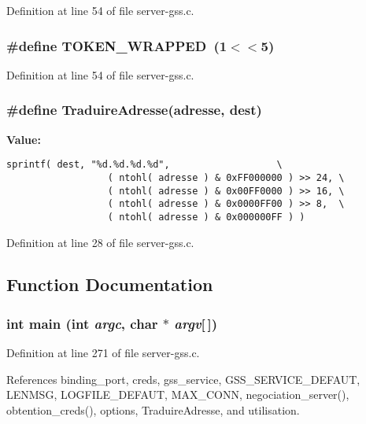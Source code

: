 Definition at line 54 of file server-gss.c.
\subsubsection{\setlength{\rightskip}{0pt plus 5cm}\#define TOKEN\_\-WRAPPED\ (1$<$$<$5)}\label{server-gss_8c_a11}




Definition at line 54 of file server-gss.c.
\subsubsection{\setlength{\rightskip}{0pt plus 5cm}\#define Traduire\-Adresse(adresse, dest)}\label{server-gss_8c_a0}


{\bf Value:}

\footnotesize\begin{verbatim}sprintf( dest, "%d.%d.%d.%d",                   \
                  ( ntohl( adresse ) & 0xFF000000 ) >> 24, \
                  ( ntohl( adresse ) & 0x00FF0000 ) >> 16, \
                  ( ntohl( adresse ) & 0x0000FF00 ) >> 8,  \
                  ( ntohl( adresse ) & 0x000000FF ) )
\end{verbatim}\normalsize 


Definition at line 28 of file server-gss.c.

\subsection{Function Documentation}
\subsubsection{\setlength{\rightskip}{0pt plus 5cm}int main (int {\em argc}, char $\ast$ {\em argv}[$\,$])}\label{server-gss_8c_a35}




Definition at line 271 of file server-gss.c.

References binding\_\-port, creds, gss\_\-service, GSS\_\-SERVICE\_\-DEFAUT, LENMSG, LOGFILE\_\-DEFAUT, MAX\_\-CONN, negociation\_\-server(), obtention\_\-creds(), options, Traduire\-Adresse, and utilisation.
